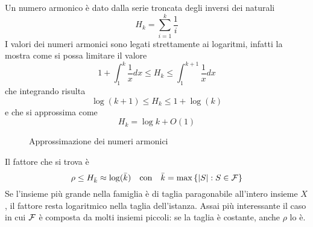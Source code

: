 \begin{definition}
    \label{def:numeroarmonico}
    Un numero armonico è dato dalla serie troncata degli inversi dei naturali
    \begin{equation*}
        H_k = \sum_{i=1}^{k} \frac{1}{i}
    \end{equation*}
    I valori dei numeri armonici sono legati strettamente ai logaritmi, infatti la  mostra come si possa limitare il valore
    \begin{equation*}
        1 + \int_{1}^{k} \frac{1}{x} dx
        \leq
        H_k
        \leq
        \int_{1}^{k+1} \frac{1}{x} dx
    \end{equation*}
    che integrando risulta
    \begin{equation*}
        \log \left( k+1 \right)
        \leq
        H_k
        \leq
        1 + \log \left( k \right)
    \end{equation*}
    e che si approssima come
    \begin{equation*}
        H_k = \log k + O\left( 1 \right)
    \end{equation*}
\end{definition}

\begin{figure}[htp]
    \centering
    \caption{Approssimazione dei numeri armonici}
    \label{fig:numeriarmonici}
\end{figure}

Il fattore che si trova è
\begin{equation*}
    \rho \leq H_{\bar{k}}
    \approx \log (\bar{k})
    \quad
    \text{con}
    \quad
    \bar{k} = \max \left\{ |S| : S \in \mathcal{F} \right\}
\end{equation*}
Se l'insieme più grande nella famiglia è di taglia paragonabile all'intero insieme $X$, il fattore resta logaritmico nella taglia dell'istanza. Assai più interessante il caso in cui $\mathcal{F}$ è composta da molti insiemi piccoli: se la taglia è costante, anche $\rho$ lo è.

